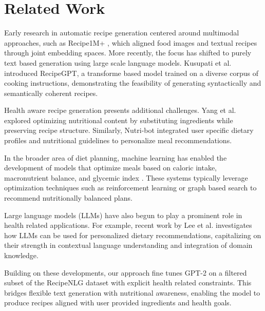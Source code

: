 \section{Related Work}

Early research in automatic recipe generation centered around multimodal approaches, such as Recipe1M+ \cite{marin2019recipe1m+}, which aligned food images and textual recipes through joint embedding spaces. More recently, the focus has shifted to purely text based generation using large scale language models. Kusupati et al. \cite{lee2020recipegpt} introduced RecipeGPT, a transforme based model trained on a diverse corpus of cooking instructions, demonstrating the feasibility of generating syntactically and semantically coherent recipes.

Health aware recipe generation presents additional challenges. Yang et al. \cite{yang2022nutritional} explored optimizing nutritional content by substituting ingredients while preserving recipe structure. Similarly, Nutri-bot \cite{mehta2023nutribot} integrated user specific dietary profiles and nutritional guidelines to personalize meal recommendations.

In the broader area of diet planning, machine learning has enabled the development of models that optimize meals based on caloric intake, macronutrient balance, and glycemic index \cite{fang2020diet}. These systems typically leverage optimization techniques such as reinforcement learning or graph based search to recommend nutritionally balanced plans.

Large language models (LLMs) have also begun to play a prominent role in health related applications. For example, recent work by Lee et al. \cite{lee2023llmhealth} investigates how LLMs can be used for personalized dietary recommendations, capitalizing on their strength in contextual language understanding and integration of domain knowledge.

Building on these developments, our approach fine tunes GPT-2 on a filtered subset of the RecipeNLG dataset with explicit health related constraints. This bridges flexible text generation with nutritional awareness, enabling the model to produce recipes aligned with user provided ingredients and health goals.
